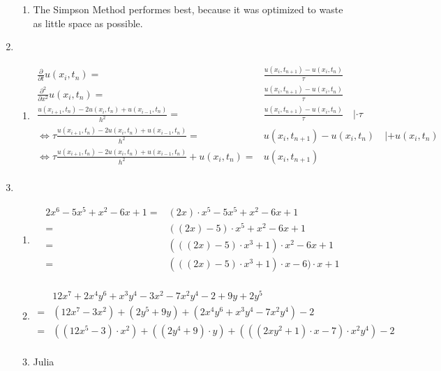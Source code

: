 \documentclass[]{book}
\theoremstyle{definition}
\begin{document}
\begin{enumerate}
\begin{enumerate}
        \item The Simpson Method performes best, because it was optimized to waste as little space as possible.
    \end{enumerate}
    \item \begin{enumerate}
        \item \begin{align*}
            \frac{\partial}{\partial t}u(x_i, t_n) = & \frac{u(x_i, t_{n + 1}) - u(x_i, t_n)}{\tau} \\
            \frac{\partial^2}{\partial x^2}u(x_i, t_n) = & \frac{u(x_i, t_{n + 1}) - u(x_i, t_n)}{\tau} \\
            \frac{u(x_{i + 1}, t_n) - 2u(x_{i}, t_n) + u(x_{i - 1}, t_n)}{h^2} = & \frac{u(x_i, t_{n + 1}) - u(x_i, t_n)}{\tau} \quad | \cdot \tau\\
            \Leftrightarrow \tau \frac{u(x_{i + 1}, t_n) - 2u(x_{i}, t_n) + u(x_{i - 1}, t_n)}{h^2} = & u(x_i, t_{n + 1}) - u(x_i, t_n) \quad | + u(x_i, t_n)\\
            \Leftrightarrow \tau \frac{u(x_{i + 1}, t_n) - 2u(x_{i}, t_n) + u(x_{i - 1}, t_n)}{h^2} + u(x_i, t_n) = & u(x_i, t_{n + 1})\\
        \end{align*}
    \end{enumerate}
    \item \begin{enumerate}
        \item \begin{align*}
            2x^6 - 5x^5 + x^2 - 6x + 1 = & (2x) \cdot x^5 - 5x^5 + x^2 - 6x + 1 \\
            = & ((2x) - 5) \cdot x^5 + x^2 - 6x + 1 \\
            = & (((2x) - 5) \cdot x^3 + 1) \cdot x^2 - 6x + 1 \\
            = & (((2x) - 5) \cdot x^3 + 1) \cdot x -6) \cdot x + 1 \\
        \end{align*}
        \item \begin{align*}
            &12x^7 + 2x^4y^6 + x^3y^4 - 3x^2 - 7x^2y^4 - 2 + 9y + 2y^5 \\= & (12x^7 - 3x^2) + (2y^5 + 9y) + (2x^4y^6 + x^3y^4 - 7x^2y^4) - 2 \\
            = & ((12x^5 - 3) \cdot x^2) + ((2y^4 + 9) \cdot y) + (((2xy^2 + 1) \cdot x - 7) \cdot x^2y^4) - 2 \\
        \end{align*}
        \item Julia
    \end{enumerate}
\end{enumerate}
\end{document}
